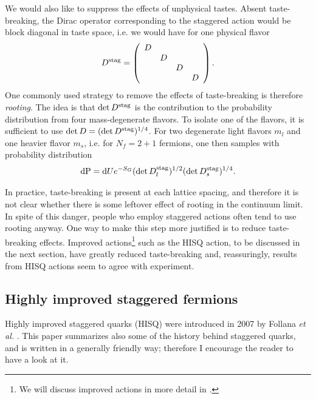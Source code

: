 We would also like to suppress the effects of unphysical tastes. Absent
taste-breaking, the Dirac operator corresponding to the staggered action
would be block diagonal in taste space, i.e. we would have for 
one physical flavor
\begin{equation}
D^{\rm stag}=\left(\begin{array}{cccc}
            D &   &  &  \\
              & D &  &  \\
              &   & D&  \\
              &   &  & D\\
            \end{array}\right).
\end{equation}
One commonly used strategy to remove the effects of taste-breaking is
therefore {\it rooting}. The idea is that $\det D^{\rm stag}$ is
the contribution to the probability distribution from four mass-degenerate
flavors. To isolate one of the flavors, it is sufficient to use
$\det D=(\det D^{\rm stag})^{1/4}$. For two degenerate light flavors
$m_l$ and one heavier flavor $m_s$, i.e. for $N_f=2+1$ fermions, 
one then samples with probability distribution
\begin{equation}\label{eq:HISQdist}
  \dd{\rm P}
    =\dd Ue^{-S_G}(\det D_l^{\rm stag})^{1/2}(\det D_s^{\rm stag})^{1/4}.
\end{equation}

In practice, taste-breaking is present at each lattice spacing, and
therefore it is not clear whether there is some leftover effect of rooting
in the continuum limit. In spite of this danger, people who employ staggered
actions often tend to use rooting anyway. One way to make this step more
justified is to reduce taste-breaking effects. Improved 
actions\footnote{We will discuss improved actions in more detail in 
.} such
as the HISQ action, to be discussed in the next section, have greatly
reduced taste-breaking and, reassuringly, results from HISQ actions
seem to agree with experiment.


\subsection{Highly improved staggered fermions}\label{sec:HISQ}

Highly improved staggered quarks (HISQ) were introduced in 2007 by
Follana {\it et al.} \cite{follana_highly_2007}. This paper summarizes also
some of the history behind staggered quarks, and is written in a generally
friendly way; therefore I encourage the reader to have a look at it.

